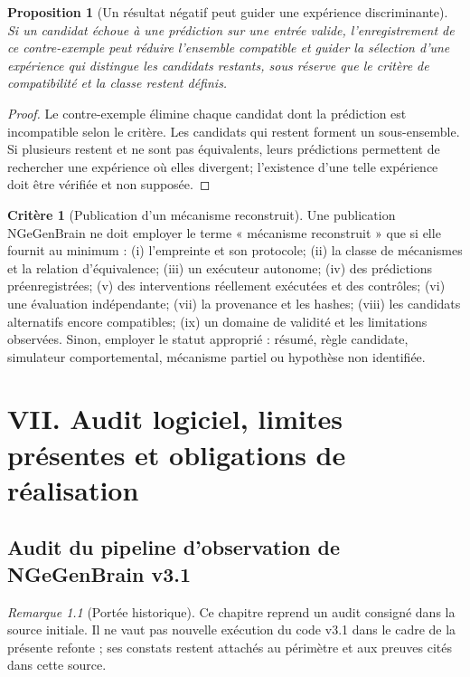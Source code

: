 \documentclass[11pt,oneside]{book}
\newtheorem{proposition}[theoreme]{Proposition}
\theoremstyle{definition}
\newtheorem{critere}[theoreme]{Critère}
\theoremstyle{remark}
\newtheorem{remarque}[theoreme]{Remarque}
\newcommand{\1}{\mathbf 1}
\begin{document}
\begin{proposition}[Un résultat négatif peut guider une expérience discriminante]
Si un candidat échoue à une prédiction sur une entrée valide, l'enregistrement de ce contre-exemple peut réduire l'ensemble compatible et guider la sélection d'une expérience qui distingue les candidats restants, sous réserve que le critère de compatibilité et la classe restent définis.
\end{proposition}
\begin{proof}
Le contre-exemple élimine chaque candidat dont la prédiction est incompatible selon le critère. Les candidats qui restent forment un sous-ensemble. Si plusieurs restent et ne sont pas équivalents, leurs prédictions permettent de rechercher une expérience où elles divergent; l'existence d'une telle expérience doit être vérifiée et non supposée.\end{proof}

\begin{critere}[Publication d'un mécanisme reconstruit]
Une publication NGeGenBrain ne doit employer le terme « mécanisme reconstruit » que si elle fournit au minimum : (i) l'empreinte et son protocole; (ii) la classe de mécanismes et la relation d'équivalence; (iii) un exécuteur autonome; (iv) des prédictions préenregistrées; (v) des interventions réellement exécutées et des contrôles; (vi) une évaluation indépendante; (vii) la provenance et les hashes; (viii) les candidats alternatifs encore compatibles; (ix) un domaine de validité et les limitations observées. Sinon, employer le statut approprié : résumé, règle candidate, simulateur comportemental, mécanisme partiel ou hypothèse non identifiée.
\end{critere}

\part{VII. Audit logiciel, limites présentes et obligations de réalisation}

\chapter{Audit du pipeline d'observation de NGeGenBrain v3.1}

\begin{remarque}[Portée historique]Ce chapitre reprend un audit consigné dans la source initiale. Il ne vaut pas nouvelle exécution du code v3.1 dans le cadre de la présente refonte ; ses constats restent attachés au périmètre et aux preuves cités dans cette source.\end{remarque}
\end{document}
